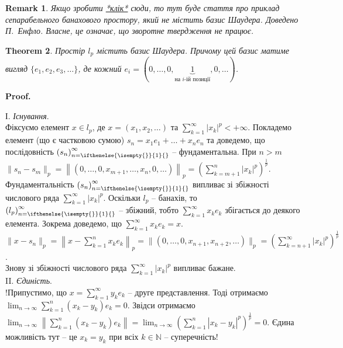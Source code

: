 \documentclass[a4paper, 10pt]{article}
\makeatletter
\theoremstyle{theoremdd}
\newtheorem{theorem}{Theorem}[subsection]
\theoremstyle{theoremdd}
\theoremstyle{theoremdd}
\theoremstyle{theoremdd}
\theoremstyle{theoremdd}
\theoremstyle{theoremdd}
\newtheorem{remark}[theorem]{Remark}
\theoremstyle{theoremdd}
\theoremstyle{theoremdd}
\newcommand{\sequence}[2][]{\left({#2}\right)_{n=\ifthenelse{\isempty{#1}}{1}{#1}}^{\infty}}
\renewenvironment{proof}[1][Proof.\\]{\par
\pushQED{\hfill \qed}%
\normalfont \topsep6\p@\@plus6\p@\relax
\trivlist
\item\relax
{\bfseries
#1\@addpunct{.}}\hspace\labelsep\ignorespaces
}{%
\popQED\endtrivlist\@endpefalse
}
\makeatother
\begin{document}
\begin{remark}
Якщо зробити \textcolor{red}{\href{https://projecteuclid.org/download/pdf_1/euclid.acta/1485889774}{*клік*}} сюди, то тут буде стаття про приклад сепарабельного банахового простору, який не містить базис Шаудера. Доведено П.\ Енфло. Власне, це означає, що зворотне твердження не працює.
\end{remark}

\begin{theorem}
Простір $l_p$ містить базис Шаудера. Причому цей базис матиме вигляд $\{e_1,e_2,e_3,\dots\}$, де кожний $e_i = (0,\dots,0,\underbrace{1}_{\text{на $i$-ій позиції}},0,\dots)$.
\end{theorem}

\begin{proof}
І. \textit{Існування}.\\
Фіксуємо елемент $x \in l_p$, де $x = (x_1,x_2,\dots)$ та $\displaystyle\sum_{k=1}^\infty |x_k|^p < +\infty$. Покладемо елемент (що є частковою сумою) $s_n = x_1 e_1 + \dots + x_n e_n$ та доведемо, що послідовність $\sequence{s_n}$ -- фундаментальна. При $n > m$\\
$\|s_n - s_m \|_p = \left\| (0,\dots,0,x_{m+1},\dots,x_n,0,\dots ) \right\|_p = \displaystyle \left( \sum_{k=m+1}^n |x_k|^p \right)^{\frac{1}{p}}$.\\
Фундаментальність $\sequence{s_n}$ випливає зі збіжності числового ряда $\displaystyle\sum_{k=1}^\infty |x_k|^p$. Оскільки $l_p$ -- банахів, то $\sequence{l_p}$ -- збіжний, тобто $\displaystyle\sum_{k=1}^\infty x_k e_k$ збігається до деякого елемента. Зокрема доведемо, що $\displaystyle\sum_{k=1}^\infty x_k e_k = x$.\\
$\|x-s_n\|_p = \displaystyle \left\| x - \sum_{k=1}^n x_k e_k \right\|_p = \| (0,\dots,0,x_{n+1},x_{n+2},\dots)\|_p = \left( \sum_{k=n+1}^\infty |x_k|^p \right)^{\frac{1}{p}}$.\\
Знову зі збіжності числового ряда $\displaystyle\sum_{k=1}^\infty |x_k|^p$ випливає бажане.
\bigskip \\
II. \textit{Єдиність}.\\
!Припустимо, що $x = \displaystyle\sum_{k=1}^\infty y_k e_k$ -- друге представлення. Тоді отримаємо $\displaystyle\lim_{n \to \infty} \sum_{k=1}^n (x_k-y_k)e_k = 0$. Звідси отримаємо $\displaystyle\lim_{n \to \infty}\left\| \sum_{k=1}^n (x_k-y_k) e_k \right\| = \lim_{n \to \infty} \left(\sum_{k=1}^n |x_k-y_k|^p\right)^{\frac{1}{p}} = 0$. Єдина можливість тут -- це $x_k = y_k$ при всіх $k \in \mathbb{N}$ -- суперечність!
\end{proof}
\end{document}
